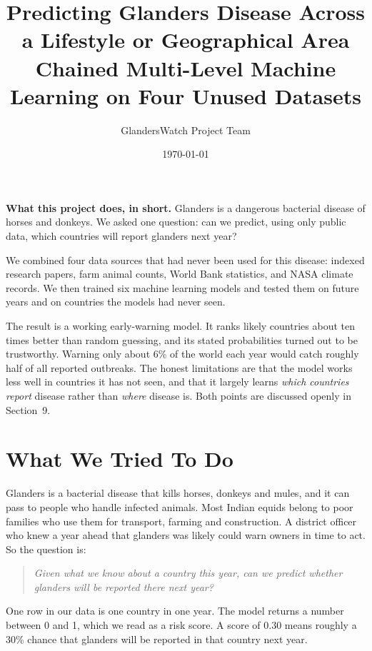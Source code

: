 \documentclass[10pt]{article}
\title{\textbf{Predicting Glanders Disease Across a Lifestyle or Geographical Area}\\[0.3em]
\large Chained Multi-Level Machine Learning on Four Unused Datasets}
\author{GlandersWatch Project Team}
\date{\today}
\begin{document}

\maketitle

\noindent
\textbf{What this project does, in short.} Glanders is a dangerous bacterial disease of
horses and donkeys. We asked one question: can we predict, using only public data,
which countries will report glanders next year?

We combined four data sources that had never been used for this disease: indexed
research papers, farm animal counts, World Bank statistics, and NASA climate records.
We then trained six machine learning models and tested them on future years and on
countries the models had never seen.

The result is a working early-warning model. It ranks likely countries about ten times
better than random guessing, and its stated probabilities turned out to be trustworthy.
Warning only about 6\% of the world each year would catch roughly half of all reported
outbreaks. The honest limitations are that the model works less well in countries it has
not seen, and that it largely learns \emph{which countries report} disease rather than
\emph{where} disease is. Both points are discussed openly in Section~9.


\section{What We Tried To Do}

Glanders is a bacterial disease that kills horses, donkeys and mules, and it can pass to
people who handle infected animals. Most Indian equids belong to poor families who use
them for transport, farming and construction. A district officer who knew a year ahead
that glanders was likely could warn owners in time to act. So the question is:

\begin{quote}
\emph{Given what we know about a country this year, can we predict whether glanders
will be reported there next year?}
\end{quote}

One row in our data is one country in one year. The model returns a number between 0 and
1, which we read as a risk score. A score of 0.30 means roughly a 30\% chance that
glanders will be reported in that country next year.
\end{document}
